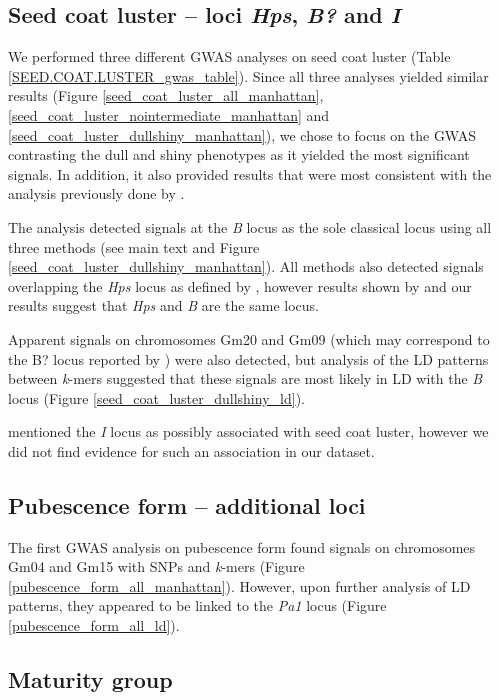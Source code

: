 \documentclass[12pt]{article}
\begin{document}
\subsection*{Seed coat luster -- loci \textit{Hps}, \textit{B?} and \textit{I}}
\label{sv-gwas-seed-coat-luster}

We performed three different GWAS analyses on seed coat luster (Table
\ref{SEED.COAT.LUSTER_gwas_table}). Since all three analyses yielded similar results
(Figure \ref{seed_coat_luster_all_manhattan},
\ref{seed_coat_luster_nointermediate_manhattan} and
\ref{seed_coat_luster_dullshiny_manhattan}), we chose to focus on the
GWAS contrasting the dull and shiny phenotypes as it yielded the most
significant signals. In addition, it also provided results that were most consistent with the
analysis previously done by .

The analysis detected signals at the \emph{B} locus as the sole classical locus
using all three methods (see main text and Figure
\ref{seed_coat_luster_dullshiny_manhattan}).  All methods also detected signals
overlapping the \emph{Hps} locus as defined by , however
results shown by  and our results suggest that \emph{Hps} and
\emph{B} are the same locus. 

Apparent signals on chromosomes Gm20 and Gm09 (which may correspond to the B?
locus reported by ) were also detected, but analysis of the
LD patterns between \emph{k}-mers suggested that these signals are most likely
in LD with the \emph{B} locus (Figure \ref{seed_coat_luster_dullshiny_ld}).

 mentioned the \textit{I} locus as possibly associated
with seed coat luster, however we did not find evidence for such an association
in our dataset.

\subsection*{Pubescence form -- additional loci}
\label{sv-gwas-pubesence-form}

The first GWAS analysis on pubescence form found signals on chromosomes Gm04
and Gm15 with SNPs and \emph{k}-mers (Figure
\ref{pubescence_form_all_manhattan}). However, upon further analysis of LD
patterns, they appeared to be linked to the \emph{Pa1} locus (Figure
\ref{pubescence_form_all_ld}).


\subsection*{Maturity group}
\label{annexe-sv-gwas-maturity}
\end{document}
